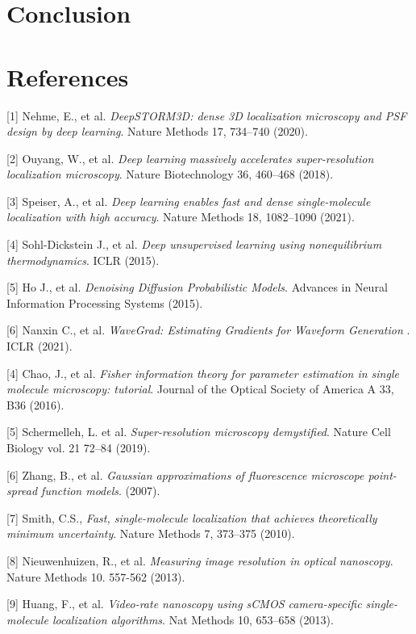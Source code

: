 \documentclass{article}
\begin{document}
\section{Conclusion}



\section*{References}


{
\small


[1] Nehme, E., et al. {\it DeepSTORM3D: dense 3D localization microscopy and PSF design by deep learning}. Nature Methods 17, 734–740 (2020).


[2] Ouyang, W., et al. {\it Deep learning massively accelerates super-resolution localization microscopy}. Nature Biotechnology 36, 460–468 (2018).


[3] Speiser, A., et al. {\it Deep learning enables fast and dense single-molecule localization with high accuracy}. Nature Methods 18, 1082–1090 (2021).

[4] Sohl-Dickstein J., et al. {\it Deep unsupervised learning using nonequilibrium thermodynamics}. ICLR (2015).

[5] Ho J., et al. {\it Denoising Diffusion Probabilistic Models}. Advances in Neural Information Processing Systems (2015).

[6] Nanxin C., et al. {\it WaveGrad: Estimating Gradients for Waveform Generation
}. ICLR (2021).

[4] Chao, J., et al. {\it Fisher information theory for parameter estimation in single molecule microscopy: tutorial}. Journal of the Optical Society of America A 33, B36 (2016). 

[5] Schermelleh, L. et al. {\it Super-resolution microscopy demystified}. Nature Cell Biology vol. 21 72–84 (2019). 

[6] Zhang, B., et al. {\it Gaussian approximations of fluorescence microscope point-spread function models}. (2007). 

[7] Smith, C.S.,  {\it Fast, single-molecule localization that achieves theoretically minimum uncertainty}. Nature Methods 7, 373–375 (2010). 

[8] Nieuwenhuizen, R., et al. {\it Measuring image resolution in optical nanoscopy}. Nature Methods 10. 557-562 (2013). 

[9] Huang, F., et al. {\it Video-rate nanoscopy using sCMOS camera-specific single-molecule localization algorithms}. Nat Methods 10, 653–658 (2013). 

}
\end{document}
